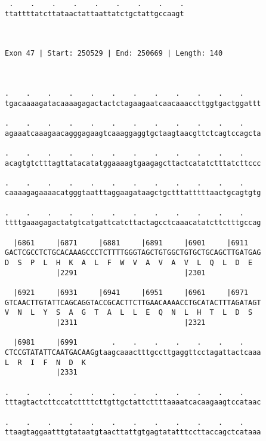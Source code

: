 \documentclass{article}
\begin{document}
\begin{Verbatim}
 .    .    .    .    .    .    .    .    .
ttattttatcttataactattaattatctgctattgccaagt
                                          
                                          
 
Exon 47 | Start: 250529 | End: 250669 | Length: 140



.    .    .    .    .    .    .    .    .    .    .    .    
tgacaaaagatacaaaagagactactctagaagaatcaacaaaccttggtgactggattt
                                                            
.    .    .    .    .    .    .    .    .    .    .    .    
agaaatcaaagaacagggagaagtcaaaggaggtgctaagtaacgttctcagtccagcta
                                                            
.    .    .    .    .    .    .    .    .    .    .    .    
acagtgtctttagttatacatatggaaaagtgaagagcttactcatatctttatcttccc
                                                            
.    .    .    .    .    .    .    .    .    .    .    .    
caaaagagaaaacatgggtaatttaggaagataagctgctttatttttaactgcagtgtg
                                                            
.    .    .    .    .    .    .    .    .    .    .    .    
ttttgaaagagactatgtcatgattcatcttactagcctcaaacatatcttctttgccag
                                                            
  |6861     |6871     |6881     |6891     |6901     |6911   
GACTCGCCTCTGCACAAAGCCCTCTTTTGGGTAGCTGTGGCTGTGCTGCAGCTTGATGAG
D  S  P  L  H  K  A  L  F  W  V  A  V  A  V  L  Q  L  D  E  
            |2291                         |2301             
  
  |6921     |6931     |6941     |6951     |6961     |6971   
GTCAACTTGTATTCAGCAGGTACCGCACTTCTTGAACAAAACCTGCATACTTTAGATAGT
V  N  L  Y  S  A  G  T  A  L  L  E  Q  N  L  H  T  L  D  S  
            |2311                         |2321             
  
  |6981     |6991        .    .    .    .    .    .    .    
CTCCGTATATTCAATGACAAGgtaagcaaactttgccttgaggttcctagattactcaaa
L  R  I  F  N  D  K                                         
            |2331                                           
  
.    .    .    .    .    .    .    .    .    .    .    .    
tttagtactcttccatcttttcttgttgctattcttttaaaatcacaagaagtccataac
                                                            
.    .    .    .    .    .    .    .    .    .    .    .    
ttaagtaggaatttgtataatgtaacttattgtgagtatatttccttaccagctcataaa
                                                            

\end{Verbatim}
\end{document}
